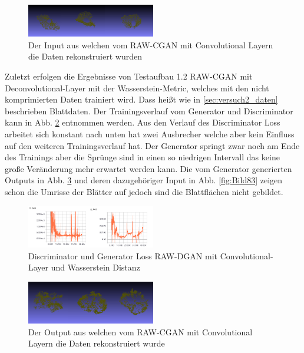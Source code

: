 \documentclass{llncs}
\begin{document}
\begin{figure}[htbp] 
	\centering
	\includegraphics[width=0.5\textwidth]{dc_pgan_ws_real.png}
	\caption{Der Input aus welchen vom RAW-CGAN mit Convolutional Layern die Daten rekonstruiert wurden}
	\label{fig:Bild78}
\end{figure}

Zuletzt erfolgen die Ergebnisse von Testaufbau 1.2 RAW-CGAN mit Deconvolutional-Layer mit der Wasserstein-Metric, welches mit den nicht komprimierten Daten trainiert wird. Dass heißt wie in \ref{sec:versuch2_daten} beschrieben Blattdaten. Der Trainingsverlauf vom Generator und Discriminator kann in Abb. \ref{fig:Bild81} entnommen werden. Aus den Verlauf des Discriminator Loss arbeitet sich konstant nach unten hat zwei Ausbrecher welche aber kein Einfluss auf den weiteren Trainingsverlauf hat. Der Generator springt zwar noch am Ende des Trainings aber die Sprünge sind in einen so niedrigen Intervall das keine große Veränderung mehr erwartet werden kann. Die vom Generator generierten Outputs in Abb. \ref{fig:Bild82} und deren dazugehöriger Input in Abb. \ref{fig:Bild83} zeigen schon die Umrisse der Blätter auf jedoch sind die Blattflächen nicht gebildet. 

\begin{figure}[htbp] 
	\centering
	\includegraphics[width=0.5\textwidth]{cgan_ws_loss.png}
	\caption{Discriminator und Generator Loss RAW-DGAN mit Convolutional-Layer und Wasserstein Distanz}
	\label{fig:Bild81}
\end{figure}

\begin{figure}[htbp] 
	\centering
	\includegraphics[width=0.5\textwidth]{raw_cgan_ws_fake.png}
	\caption{Der Output aus welchen vom RAW-CGAN mit Convolutional Layern die Daten rekonstruiert wurde}
	\label{fig:Bild82}
\end{figure}
\end{document}
